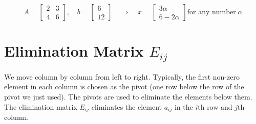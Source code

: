 \[
    A=
    \begin{bmatrix}
        2 & 3 \\
        4 & 6
    \end{bmatrix},
    \quad
    b=
    \begin{bmatrix}
        6 \\ 12
    \end{bmatrix}
    \quad\Rightarrow\quad
    x=
    \begin{bmatrix}
        3\alpha \\ 6-2\alpha
    \end{bmatrix}
    \text{for any number} \; \alpha
\]

\section{Elimination Matrix $E_{ij}$}

We move column by column from left to right. Typically, the first non-zero element in each column is chosen as the pivot (one row below the row of the pivot we just used).
The pivots are used to eliminate the elements below them.
The elimination matrix $E_{ij}$ eliminates the element $a_{ij}$ in the $i$th row and $j$th column.


